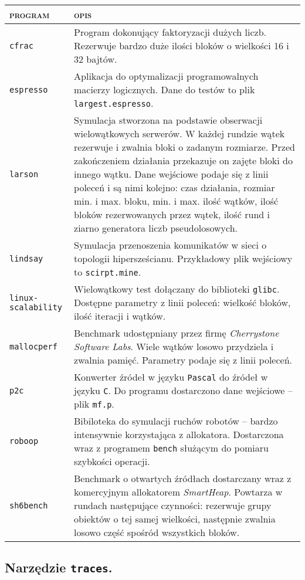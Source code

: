 \documentclass[12pt,a4paper,titlepage,twoside]{mwart}
\begin{document}
\begin{tabularx}{\textwidth}{|l|X|}
\hline
\textsc{program} & \textsc{opis} \\
\hline
\hline
\verb+cfrac+ & Program dokonujący faktoryzacji dużych liczb. Rezerwuje bardzo
duże ilości bloków o wielkości 16 i 32 bajtów. \\
\hline
\verb+espresso+ & Aplikacja do optymalizacji programowalnych macierzy
logicznych. Dane do testów to plik \texttt{largest.espresso}. \\
\hline
\verb+larson+ & Symulacja stworzona na podstawie obserwacji wielowątkowych
serwerów. W każdej rundzie wątek rezerwuje i zwalnia bloki o zadanym rozmiarze.
Przed zakończeniem działania przekazuje on zajęte bloki do innego wątku. Dane
wejściowe podaje się z linii poleceń i są nimi kolejno: czas działania, rozmiar
min. i max. bloku, min. i max.  ilość wątków, ilość bloków rezerwowanych przez
wątek, ilość rund i ziarno generatora liczb pseudolosowych. \\
\hline
\verb+lindsay+ & Symulacja przenoszenia komunikatów w sieci o topologii
hipersześcianu. Przykładowy plik wejściowy to \texttt{scirpt.mine}. \\
\hline
\verb+linux-scalability+ & Wielowątkowy test dołączany do biblioteki
\texttt{glibc}. Dostępne parametry z linii poleceń: wielkość bloków, ilość
iteracji i wątków.\\
\hline
\verb+mallocperf+ & Benchmark udostępniany przez firmę \textit{Cherrystone
Software Labs}. Wiele wątków losowo przydziela i zwalnia pamięć. Parametry
podaje się z linii poleceń.\\
\hline
\verb+p2c+ & Konwerter źródeł w języku \texttt{Pascal} do źródeł w języku
\texttt{C}. Do programu dostarczono dane wejściowe -- plik \texttt{mf.p}. \\
\hline
\verb+roboop+ & Bibiloteka do symulacji ruchów robotów -- bardzo intensywnie
korzystająca z allokatora. Dostarczona wraz z programem \texttt{bench} służącym
do pomiaru szybkości operacji. \\
\hline
\verb+sh6bench+ & Benchmark o otwartych źródłach dostarczany wraz z komercyjnym
allokatorem \textit{SmartHeap}. Powtarza w rundach następujące czynności:
rezerwuje grupy obiektów o tej samej wielkości, następnie zwalnia losowo część
spośród wszystkich bloków. \\
\hline
\end{tabularx}

\subsection{Narzędzie \texttt{traces}.}
\end{document}
